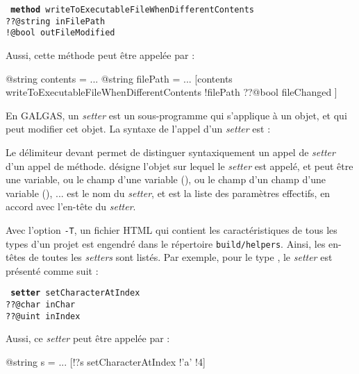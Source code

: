 {{\texttt{
\textbf{method} writeToExecutableFileWhenDifferentContents\\
\hspace*{2cm}??@string inFilePath\\
\hspace*{2cm}!@bool outFileModified
}

Aussi, cette méthode peut être appelée par :
\begin{galgascode}
@string contents = ...
@string filePath = ...
[contents writeToExecutableFileWhenDifferentContents
  !filePath
  ??@bool fileChanged
]
\end{galgascode}






En GALGAS, un \emph{setter} est un sous-programme qui s'applique à un objet, et qui peut modifier cet objet. La syntaxe de l'appel d'un  \emph{setter} est :
\begin{galgascode}
\end{galgascode}

Le délimiteur  devant  permet de distinguer syntaxiquement un appel de \emph{setter} d'un appel de méthode.  désigne l'objet sur lequel le \emph{setter} est appelé, et peut être une variable, ou le champ d'une variable (), ou le champ d'un champ d'une variable (), ...  est le nom du \emph{setter}, et  est la liste des paramètres effectifs, en accord avec l'en-tête du \emph{setter}.

Avec l'option \texttt{-T}, un fichier HTML qui contient les caractéristiques de tous les types d'un projet est engendré dans le répertoire \texttt{build/helpers}. Ainsi, les en-têtes de toutes les \emph{setters} sont listés. Par exemple, pour le type , le \emph{setter}  est présenté comme suit :

\texttt{
\textbf{setter} setCharacterAtIndex\\
\hspace*{2cm}??@char inChar\\
\hspace*{2cm}??@uint inIndex
}

Aussi, ce \emph{setter} peut être appelée par :
\begin{galgascode}
@string s = ...
[!?s setCharacterAtIndex !'a' !4]
\end{galgascode}






}}
